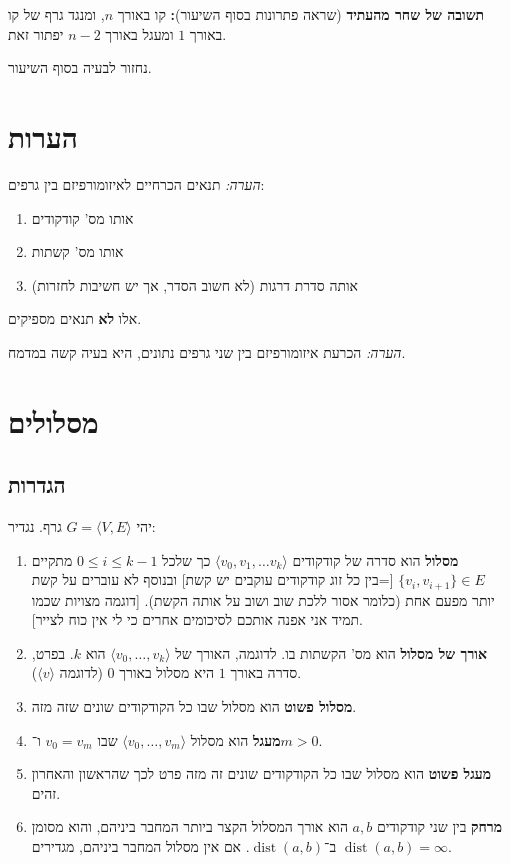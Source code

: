 \documentclass[]{article}
\newcommand\ra    {\rangle}
\newcommand\la    {\langle}
\renewcommand\inf {\infty}
\DeclareMathOperator{\dist}{dist}
\begin{document}
	\textbf{תשובה של שחר מהעתיד }(שראה פתרונות בסוף השיעור)\textbf{: }קו באורך $n$, ומנגד גרף של קו באורך $1$ ומעגל באורך $n - 2$ יפתור זאת. 
	
	נחזור לבעיה בסוף השיעור. 
	
	
	\section{הערות}
	\textit{הערה: }תנאים הכרחיים לאיזומורפיזם בין גרפים: 
	\begin{enumerate}
		\item אותו מס' קודקודים
		\item אותו מס' קשתות
		\item אותה סדרת דרגות (לא חשוב הסדר, אך יש חשיבות לחזרות)
	\end{enumerate}
	אלו \textbf{לא} תנאים מספיקים. 
	
	\textit{הערה: }הכרעת איזומורפיזם בין שני גרפים נתונים, היא בעיה קשה במדמח. 
	
	\section{מסלולים}
	\subsection{הגדרות}
	יהי $G = \la V, E \ra$ גרף. נגדיר: 
	\begin{enumerate}
		\item \textbf{מסלול } הוא סדרה של קודקודים $\la v_0, v_1, \dots v_k \ra$ כך שלכל $0 \le i \le k - 1$ מתקיים $\{v_i, v_{i + 1}\} \in E$ [=בין כל זוג קודקודים עוקבים יש קשת] ובנוסף לא עוברים על קשת יותר מפעם אחת (כלומר אסור ללכת שוב ושוב על אותה הקשת). [דוגמה מצויות שכמו תמיד אני אפנה אותכם לסיכומים אחרים כי לי אין כוח לצייר]. 
		\item \textbf{אורך של מסלול} הוא מס' הקשתות בו. לדוגמה, האורך של $\la v_0, \dots, v_k \ra$ הוא $k$. בפרט, סדרה באורך $1$ היא מסלול באורך $0$ (לדוגמה $\la v \ra$). 
		\item \textbf{מסלול פשוט} הוא מסלול שבו כל הקודקודים שונים שזה מזה. 
		\item \textbf{מעגל} הוא מסלול $\la v_0, \dots, v_m \ra$ שבו $v_0 = v_m$ ו־$m > 0$. 
		\item \textbf{מעגל פשוט} הוא מסלול שבו כל הקודקודים שונים זה מזה פרט לכך שהראשון והאחרון זהים. 
		\item \textbf{מרחק} בין שני קודקודים $a, b$ הוא אורך המסלול הקצר ביותר המחבר ביניהם, והוא מסומן ב־$\dist(a, b)$. אם אין מסלול המחבר ביניהם, מגדירים $\dist(a, b) = \inf$.
	\end{enumerate}
	
\end{document}
